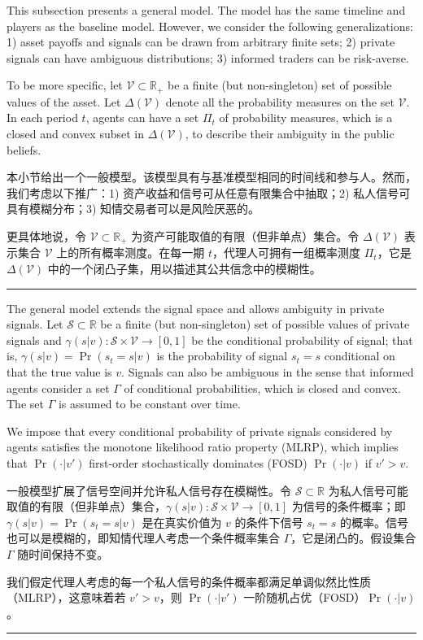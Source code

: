 \documentclass[12pt,a4paper]{article}
\newenvironment{original}{%
  \par\vspace{4pt}\noindent%
  \color{black}%
  \ignorespaces
}{%
  \par\vspace{2pt}%
}
\newenvironment{translation}{%
  \par\vspace{2pt}\noindent%
  \color{transblue}%
  \ignorespaces
}{%
  \par\vspace{4pt}\hrule\vspace{6pt}%
}
\begin{document}
\begin{original}
This subsection presents a general model. The model has the same timeline and players as the baseline model. However, we consider the following generalizations: 1) asset payoffs and signals can be drawn from arbitrary finite sets; 2) private signals can have ambiguous distributions; 3) informed traders can be risk-averse.

To be more specific, let $\mathcal{V} \subset \mathbb{R}_+$ be a finite (but non-singleton) set of possible values of the asset. Let $\Delta(\mathcal{V})$ denote all the probability measures on the set $\mathcal{V}$. In each period $t$, agents can have a set $\Pi_t$ of probability measures, which is a closed and convex subset in $\Delta(\mathcal{V})$, to describe their ambiguity in the public beliefs.
\end{original}
\begin{translation}
本小节给出一个一般模型。该模型具有与基准模型相同的时间线和参与人。然而，我们考虑以下推广：1) 资产收益和信号可从任意有限集合中抽取；2) 私人信号可具有模糊分布；3) 知情交易者可以是风险厌恶的。

更具体地说，令 $\mathcal{V} \subset \mathbb{R}_+$ 为资产可能取值的有限（但非单点）集合。令 $\Delta(\mathcal{V})$ 表示集合 $\mathcal{V}$ 上的所有概率测度。在每一期 $t$，代理人可拥有一组概率测度 $\Pi_t$，它是 $\Delta(\mathcal{V})$ 中的一个闭凸子集，用以描述其公共信念中的模糊性。
\end{translation}

\begin{original}
The general model extends the signal space and allows ambiguity in private signals. Let $\mathcal{S} \subset \mathbb{R}$ be a finite (but non-singleton) set of possible values of private signals and $\gamma(s|v): \mathcal{S} \times \mathcal{V} \to [0, 1]$ be the conditional probability of signal; that is, $\gamma(s|v) = \Pr(s_t = s|v)$ is the probability of signal $s_t = s$ conditional on that the true value is $v$. Signals can also be ambiguous in the sense that informed agents consider a set $\Gamma$ of conditional probabilities, which is closed and convex. The set $\Gamma$ is assumed to be constant over time.

We impose that every conditional probability of private signals considered by agents satisfies the monotone likelihood ratio property (MLRP), which implies that $\Pr(\cdot|v')$ first-order stochastically dominates (FOSD) $\Pr(\cdot|v)$ if $v' > v$.
\end{original}
\begin{translation}
一般模型扩展了信号空间并允许私人信号存在模糊性。令 $\mathcal{S} \subset \mathbb{R}$ 为私人信号可能取值的有限（但非单点）集合，$\gamma(s|v): \mathcal{S} \times \mathcal{V} \to [0, 1]$ 为信号的条件概率；即 $\gamma(s|v) = \Pr(s_t = s|v)$ 是在真实价值为 $v$ 的条件下信号 $s_t = s$ 的概率。信号也可以是模糊的，即知情代理人考虑一个条件概率集合 $\Gamma$，它是闭凸的。假设集合 $\Gamma$ 随时间保持不变。

我们假定代理人考虑的每一个私人信号的条件概率都满足单调似然比性质（MLRP），这意味着若 $v' > v$，则 $\Pr(\cdot|v')$ 一阶随机占优（FOSD）$\Pr(\cdot|v)$。
\end{translation}
\end{document}
